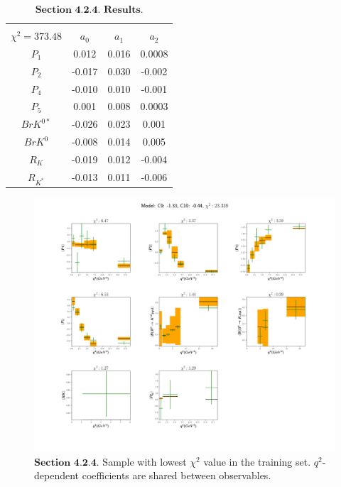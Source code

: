 \documentclass[a4paper,fleqn]{cas-dc}
\begin{document}
\begin{table}
	\begin{tabular}{ |c|c|c|c|  } 
		\hline
		\small
		\makecell{\(C_9 = -0.74\), \(C_{10} = -0.62\) \\  \(\chi^2 = 373.48 \)}
		\normalsize
		& \textbf{\(a_0\)} & \textbf{\(a_1\)} & \textbf{\(a_2\)}\\
		\hline
		\(P_1\) & 0.012 & 0.016 &  0.0008 \\
		\hline
		\(P_2\) & -0.017 & 0.030 & -0.002 \\	
		\hline
		\(P_4\) & -0.010 & 0.010 &	-0.001 \\
		\hline
		\(P_5\) & 0.001 &  0.008 &   0.0003 \\		
		\hline
		\(BrK^{0*}\) & -0.026 & 0.023 & 0.001 \\		
		\hline
		\(BrK^{0}\) & -0.008 & 0.014 & 0.005 \\		
		\hline	
		\(R_{K}\) & -0.019 & 0.012 & -0.004 \\
		\hline	
		\(R_{K^*}\) & -0.013 & 0.011 & -0.006 \\		
		\hline
		
		
	\end{tabular}
	\caption{\label{tab:GAN3Results} \(\textbf{Section 4.2.4. Results.}\) }
\end{table}
\begin{figure}
	\includegraphics[width=\textwidth]{images/AllObservablesSameCoeff.pdf}
	\caption{\(\textbf{Section 4.2.4}.\) Sample with lowest \(\chi^2 \) value in the training set.  \(q^2\)-dependent coefficients are shared between observables.}
	\label{FIG:AllObservablesSameCoeff}
\end{figure}
\end{document}
